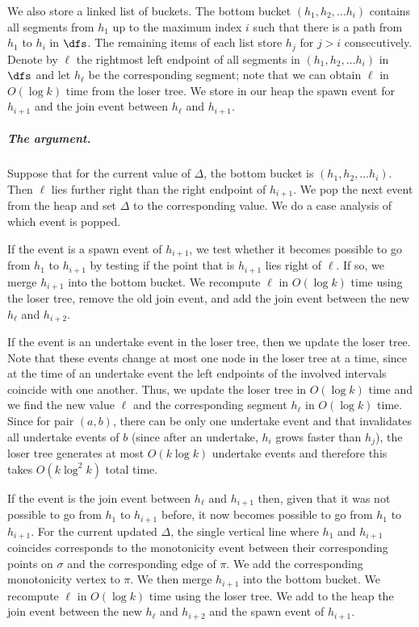 We  also store a linked list of buckets. 
The bottom bucket $(h_1, h_2, \ldots h_i)$  contains all segments from $h_1$ up to the maximum index $i$ such that there is a path from $h_1$ to $h_i$ in $\dfs$. 
The remaining items of each list store $h_j$ for $j > i$ consecutively. 
Denote by $\ell$ the rightmost left endpoint of all segments in $(h_1, h_2, \ldots h_i)$ in $\dfs$ and let $h_\ell$ be the corresponding segment; note that we can obtain $\ell$ in $O(\log k)$ time from the loser tree.  We store in our heap the spawn event for $h_{i+1}$ and the join event between $h_\ell$ and $h_{i+1}$.

\subparagraph{The argument.}
Suppose that for the current value of $\Delta$, the bottom bucket is $(h_1, h_2, \ldots h_i)$.
Then $\ell$ lies further right than the right endpoint of $h_{i+1}$. 
We pop the next event from the heap and set $\Delta$ to the corresponding value. 
We do a case analysis of which event is popped. 


If the event is a spawn event of $h_{i+1}$, we test whether it becomes possible to go from $h_1$ to $h_{i+1}$ by testing if the point that is $h_{i+1}$ lies right of $\ell$. 
If so, we merge $h_{i+1}$ into the bottom bucket. 
We recompute $\ell$ in $O(\log k)$ time using the loser tree, remove the old join event, and add the join event between the new $h_\ell$ and $h_{i+2}$. 



If the event is an undertake event in the loser tree, then we update the loser tree.
Note that these events change at most one node in the loser tree at a time, since at the time of an undertake event the left endpoints of the involved intervals coincide with one another.
Thus, we update the loser tree in $O(\log k)$ time and we find the new value $\ell$ and the corresponding segment $h_\ell$ in $O(\log k)$ time. 
Since for pair $(a, b)$, there can be only one undertake event and that invalidates all undertake events of $b$ (since after an undertake, $h_i$ grows faster than $h_j$), the loser tree generates at most $O(k \log k)$ undertake events and therefore this takes $O(k \log^2 k)$ total time. 


If the event is the join event between $h_\ell$ and $h_{i+1}$ then, given that it was not possible to go from $h_1$ to $h_{i+1}$ before, it now becomes possible to go from $h_1$ to $h_{i+1}$. 
For the current updated $\Delta$, the single vertical line where $h_1$ and $h_{i+1}$ coincides corresponds to the monotonicity event between their corresponding points on $\sigma$ and the corresponding edge of $\pi$. We add the corresponding monotonicity vertex to $\pi$.
We then merge $h_{i+1}$ into the bottom bucket. 
We recompute $\ell$ in $O(\log k)$ time using the loser tree. We add to the heap the join event between the new $h_\ell$ and $h_{i+2}$ and the spawn event of $h_{i+1}$. 

